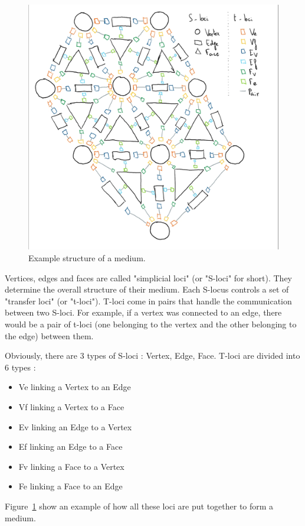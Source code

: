 \documentclass{article}
\begin{document}
\begin{figure}[H]
	\centering\includegraphics[width=0.9\linewidth]{assets/handdrawn_medium.png}
	\caption{Example structure of a medium.}
	\label{fig:example_structure}
\end{figure}

Vertices, edges and faces are called "simplicial loci" (or "S-loci" for short). They determine the overall structure of their medium. Each S-locus controls a set of "transfer loci" (or "t-loci"). T-loci come in pairs that handle the communication between two S-loci. For example, if a vertex was connected to an edge, there would be a pair of t-loci (one belonging to the vertex and the other belonging to the edge) between them.

Obviously, there are 3 types of S-loci : Vertex, Edge, Face. T-loci are divided into 6 types : 
\begin{itemize}[noitemsep,nosep]
	\item Ve linking a  Vertex to an Edge
	\item Vf linking a  Vertex to a  Face
	\item Ev linking an Edge   to a  Vertex
	\item Ef linking an Edge   to a  Face
	\item Fv linking a  Face   to a  Vertex
	\item Fe linking a  Face   to an Edge
\end{itemize}
Figure~\ref{fig:example_structure} show an example of how all these loci are put together to form a medium.\\
\end{document}
